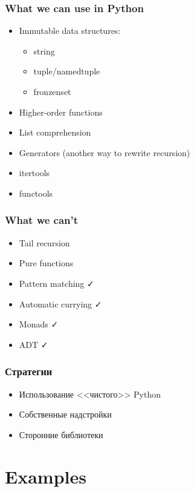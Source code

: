 \documentclass[14pt, compress, aspectratio=169]{beamer}
\def\check{\textcolor{check}{\FA \faCheck}}
\begin{document}
\begin{frame}
    \frametitle{What we can use in Python}
    \vspace{-25pt}
    \begin{itemize}[label={\MVRightarrow}]
        \item Immutable data structures:
            \begin{itemize}
                \item string
                \item tuple/namedtuple
                \item fronzenset
            \end{itemize}
        \item Higher-order functions
        \item List comprehension
        \item Generators (another way to rewrite recursion)
        \item itertools
        \item functools
    \end{itemize}
\end{frame}

\begin{frame}
    \frametitle{What we can't}
    \begin{itemize}[label={\MVRightarrow}]
        \item Tail recursion
        \item Pure functions
        \item Pattern matching \check
        \item Automatic currying \check
        \item Monads \check
        \item ADT \check
    \end{itemize}
\end{frame}

\begin{frame}
    \frametitle{Стратегии}
    \begin{itemize}[label={\MVRightarrow}]
        \item Использование <<чистого>> Python
        \item Собственные надстройки
        \item Сторонние библиотеки
    \end{itemize}
\end{frame}

\section{Examples}
\end{document}
